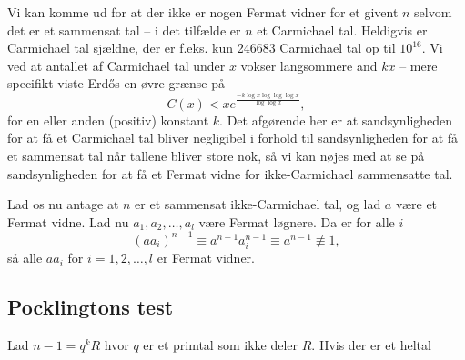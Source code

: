 Vi kan komme ud for at der ikke er nogen Fermat vidner for et givent $n$ selvom det
er et sammensat tal -- i det tilfælde er $n$ et Carmichael tal. Heldigvis er Carmichael tal
sjældne, der er f.eks. kun 246683 Carmichael tal op til $10^{16}$. Vi ved at antallet af
Carmichael tal under $x$ vokser langsommere and $kx$ -- mere specifikt viste Erdős en øvre grænse
på
$$
C(x)<xe^{\frac{-k\log x \log\log\log x}{\log\log x}},
$$
for en eller anden (positiv) konstant $k$. Det afgørende her er at sandsynligheden for at få
et Carmichael tal bliver negligibel i forhold til sandsynligheden for at få et sammensat tal
når tallene bliver store nok, så vi kan nøjes med at se på sandsynligheden for at få et
Fermat vidne for ikke-Carmichael sammensatte tal.

Lad os nu antage at $n$ er et sammensat ikke-Carmichael tal, og lad $a$ være et Fermat vidne.
Lad nu $a_1,a_2,\ldots,a_l$ være Fermat løgnere. Da er for alle $i$
$$
	(aa_i)^{n-1} \equiv a^{n-1}a_i^{n-1}\equiv a^{n-1} \not \equiv 1,
$$
så alle $aa_i$ for $i=1,2,\ldots,l$ er Fermat vidner.
\subsection{Pocklingtons test}
\begin{theorem}
Lad $n-1=q^kR$ hvor $q$ er et primtal som ikke deler $R$. Hvis der er et heltal 
\end{theorem}
